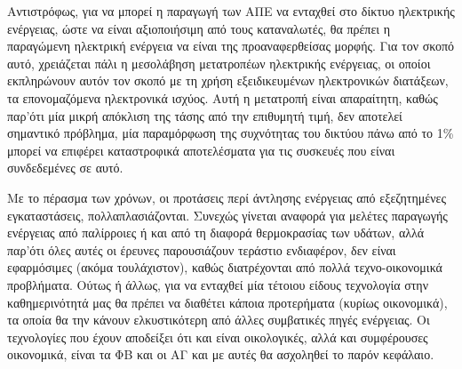 \documentclass[12pt]{report}
\begin{document}
Αντιστρόφως, για να μπορεί η παραγωγή των ΑΠΕ να ενταχθεί στο δίκτυο ηλεκτρικής ενέργειας, ώστε να είναι αξιοποιήσιμη από τους καταναλωτές, θα πρέπει η παραγώμενη ηλεκτρική ενέργεια να είναι της προαναφερθείσας μορφής. Για τον σκοπό 
αυτό, χρειάζεται πάλι η μεσολάβηση μετατροπέων ηλεκτρικής ενέργειας, οι οποίοι εκπληρώνουν αυτόν τον σκοπό με τη χρήση εξειδικευμένων ηλεκτρονικών διατάξεων, τα επονομαζόμενα ηλεκτρονικά ισχύος. Αυτή 
η μετατροπή είναι απαραίτητη, καθώς παρ'ότι μία μικρή απόκλιση της τάσης από την επιθυμητή τιμή, δεν αποτελεί σημαντικό πρόβλημα, μία παραμόρφωση της συχνότητας του δικτύου πάνω από το 1\% μπορεί να επιφέρει καταστροφικά αποτελέσματα
για τις συσκευές που είναι συνδεδεμένες σε αυτό. 

Με το πέρασμα των χρόνων, οι προτάσεις περί άντλησης ενέργειας από εξεζητημένες εγκαταστάσεις, πολλαπλασιάζονται. Συνεχώς γίνεται αναφορά για μελέτες παραγωγής ενέργειας από παλίρροιες ή και από τη διαφορά θερμοκρασίας των υδάτων, 
αλλά παρ'ότι όλες αυτές οι έρευνες παρουσιάζουν τεράστιο ενδιαφέρον, δεν είναι εφαρμόσιμες (ακόμα τουλάχιστον), καθώς διατρέχονται από πολλά τεχνο-οικονομικά προβλήματα. Ούτως ή άλλως, για να ενταχθεί μία τέτοιου είδους τεχνολογία 
στην καθημερινότητά μας θα πρέπει να διαθέτει κάποια προτερήματα (κυρίως οικονομικά), τα οποία θα την κάνουν ελκυστικότερη από άλλες συμβατικές πηγές ενέργειας. Οι τεχνολογίες που έχουν αποδείξει ότι και είναι οικολογικές, αλλά και 
συμφέρουσες οικονομικά, είναι τα ΦΒ και οι ΑΓ και με αυτές θα ασχοληθεί το παρόν κεφάλαιο. 

\pagebreak
\end{document}
